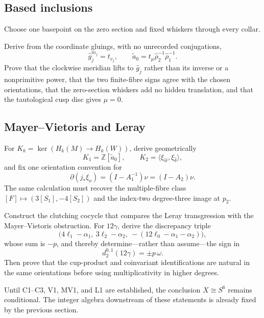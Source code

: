 \subsection{Based inclusions}

Choose one basepoint on the zero section and fixed whiskers through every collar.

\begin{obligation}
Derive from the coordinate gluings, with no unrecorded conjugations,
\[
\widehat g_j^{m_j}=t_{v_j},
\qquad
\widetilde a_0=t_\mu\widehat\rho_2^{-1}\widehat\rho_1^{-1}.
\]
Prove that the clockwise meridian lifts to $\widehat g_j$ rather than its inverse or a nonprimitive power, that the two finite-fibre signs agree with the chosen orientations, that the zero-section whiskers add no hidden translation, and that the tautological cusp disc gives $\mu=0$.
\end{obligation}

\subsection{Mayer--Vietoris and Leray}

\begin{obligation}
For $K_k=\ker(H_k(M)\to H_k(W))$, derive geometrically
\[
K_1=\mathbb Z[\widetilde a_0],
\qquad
K_2=\langle\xi_{\widehat w},\xi_{\widehat\delta}\rangle,
\]
and fix one orientation convention for
\[
\partial(j_*\xi_\nu)=(I-A_1^{-1})\nu=(I-A_2)\nu.
\]
The same calculation must recover the multiple-fibre class
\([F]\longmapsto(3[S_1],-4[S_2])\) and the index-two degree-three image at $p_2$.
\end{obligation}

\begin{obligation}
Construct the clutching cocycle that compares the Leray transgression with the Mayer--Vietoris obstruction. For $12\gamma$, derive the discrepancy triple
\[
\bigl(4\ell_1-\alpha_1,\ 3\ell_2-\alpha_2,\
-(12\ell_0-\alpha_1-\alpha_2)\bigr),
\]
whose sum is $-p$, and thereby determine---rather than assume---the sign in
\[
d_2^{0,1}(12\gamma)=\pm p\,\omega.
\]
Then prove that the cup-product and coinvariant identifications are natural in the same orientations before using multiplicativity in higher degrees.
\end{obligation}

Until C1--C3, V1, MV1, and L1 are established, the conclusion $X\cong S^6$ remains conditional. The integer algebra downstream of these statements is already fixed by the previous section.
